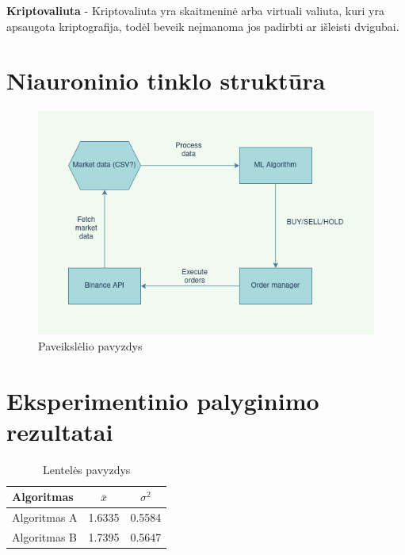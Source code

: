 \documentclass{VUMIFInfKursinis}
\begin{document}
\textbf{Kriptovaliuta} - Kriptovaliuta yra skaitmeninė arba virtuali valiuta, kuri yra apsaugota kriptografija, todėl beveik neįmanoma jos padirbti ar išleisti dvigubai.

\printbibliography[heading=bibintoc] %

\appendix  %

\section{Niauroninio tinklo struktūra}
\begin{figure}[H]
  \centering
  \includegraphics[scale=0.5]{img/DIAGRAM}
  \caption{Paveikslėlio pavyzdys}   %
  \label{img:diagram}
\end{figure}


\section{Eksperimentinio palyginimo rezultatai}
\begin{table}[H]\footnotesize
  \centering
  \caption{Lentelės pavyzdys}    %
  {\begin{tabular}{|l|c|c|} \hline
      Algoritmas   & $\bar{x}$ & $\sigma^{2}$ \\
      \hline
      Algoritmas A & 1.6335    & 0.5584       \\
      Algoritmas B & 1.7395    & 0.5647       \\
      \hline
    \end{tabular}}
  \label{tab:table example}
\end{table}
\end{document}
